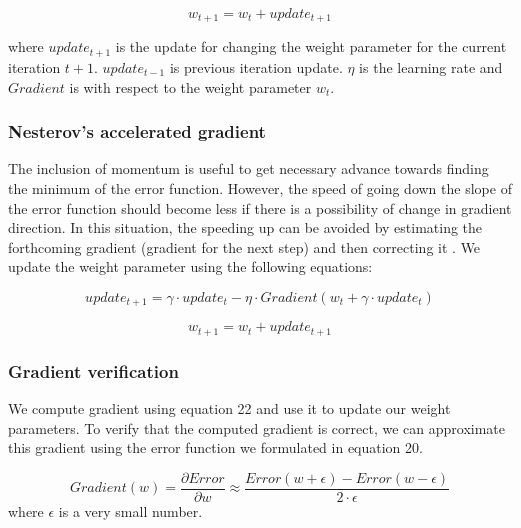 \begin{equation}
w_{t+1} = w_t + update_{t+1}
\end{equation}

where $update_{t+1}$ is the update for changing the weight parameter for the current iteration $t+1$. $update_{t-1}$ is previous iteration update. $\eta$ is the learning rate and $Gradient$ is with respect to the weight parameter $w_t$. 

\subsubsection{Nesterov’s accelerated gradient}
The inclusion of momentum is useful to get necessary advance towards finding the minimum of the error function. However, the speed of going down the slope of the error function should become less if there is a possibility of change in gradient direction. In this situation, the speeding up can be avoided by estimating the forthcoming gradient (gradient for the next step) and then correcting it \cite{Botev}. We update the weight parameter using the following equations:

\begin{equation}
update_{t+1} = \gamma \cdot update_t - \eta \cdot Gradient(w_t + \gamma \cdot update_t)
\end{equation}

\begin{equation}
w_{t+1} = w_t + update_{t+1}
\end{equation}

\subsubsection{Gradient verification}
We compute gradient using equation 22 and use it to update our weight parameters. To verify that the computed gradient is correct, we can approximate this gradient using the error function we formulated in equation 20.

\begin{equation}
Gradient(w) = \frac{\partial Error}{\partial w} \approx \frac{Error(w + \epsilon) - Error(w - \epsilon)}{2 \cdot \epsilon} 
\end{equation}
where $\epsilon$ is a very small number. 

